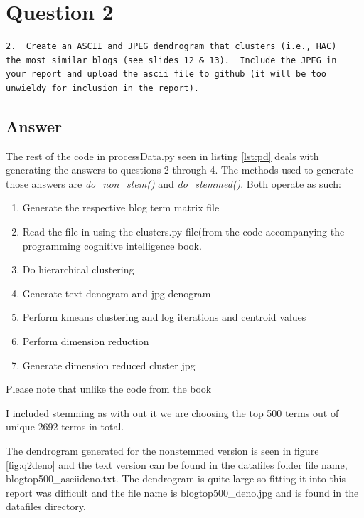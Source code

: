 \documentclass[letterpaper,10pt]{article}
\begin{document}

\clearpage

   
\newpage
\clearpage
\section*{Question 2}
\begin{verbatim}
2.  Create an ASCII and JPEG dendrogram that clusters (i.e., HAC)
the most similar blogs (see slides 12 & 13).  Include the JPEG in
your report and upload the ascii file to github (it will be too
unwieldy for inclusion in the report).
\end{verbatim}
\subsection*{Answer}

The rest of the code in processData.py seen in listing \hyperref[lst:pd]{\ref{lst:pd}} deals with generating the answers to questions 2 through 4. The methods used to generate those answers are \emph{do\_non\_stem()} and \emph{do\_stemmed()}. Both operate as such:
\begin{enumerate}
\item Generate the respective blog term matrix file
\item Read the file in using the clusters.py file(from the code accompanying the programming cognitive intelligence book. 
\item Do hierarchical clustering
\item Generate text denogram and jpg denogram
\item Perform kmeans clustering and log iterations and centroid values
\item Perform dimension reduction
\item Generate dimension reduced cluster jpg
\end{enumerate}

Please note that unlike the code from the book

I included stemming as with out it we are choosing the top 500 terms out of unique 2692 terms in total.

The dendrogram generated for the nonstemmed version is seen in figure \hyperref[fig:q2deno]{\ref{fig:q2deno}} and the text version can be found in the datafiles folder file name, blogtop500\_asciideno.txt.
The dendrogram is quite large so fitting it into this report was difficult and the file name is blogtop500\_deno.jpg and is found in the datafiles directory. 
\end{document}
